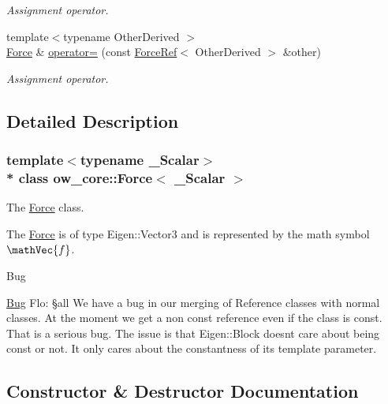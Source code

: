 \begin{DoxyCompactItemize}
\begin{DoxyCompactList}\small\item\em Assignment operator. \end{DoxyCompactList}\item 
{\footnotesize template$<$typename Other\+Derived $>$ }\\\hyperlink{classow__core_1_1Force}{Force} \& \hyperlink{classow__core_1_1Force_ab708e6964fa95d7810fc69b4c3a074ad}{operator=} (const \hyperlink{classow__core_1_1ForceRef}{Force\+Ref}$<$ Other\+Derived $>$ \&other)\hypertarget{classow__core_1_1Force_ab708e6964fa95d7810fc69b4c3a074ad}{}\label{classow__core_1_1Force_ab708e6964fa95d7810fc69b4c3a074ad}

\begin{DoxyCompactList}\small\item\em Assignment operator. \end{DoxyCompactList}\end{DoxyCompactItemize}


\subsection{Detailed Description}
\subsubsection*{template$<$typename \+\_\+\+Scalar$>$\\*
class ow\+\_\+core\+::\+Force$<$ \+\_\+\+Scalar $>$}

The \hyperlink{classow__core_1_1Force}{Force} class. 

The \hyperlink{classow__core_1_1Force}{Force} is of type Eigen\+::\+Vector3 and is represented by the math symbol $\mathVec{f}$.

\begin{DoxyRefDesc}{Bug}
\item[\hyperlink{bug__bug000003}{Bug}]Flo\+: §all We have a bug in our merging of Reference classes with normal classes. At the moment we get a non const reference even if the class is const. That is a serious bug. The issue is that Eigen\+::\+Block doesn\textquotesingle{}t care about being const or not. It only cares about the constantness of its template parameter. \end{DoxyRefDesc}


\subsection{Constructor \& Destructor Documentation}
